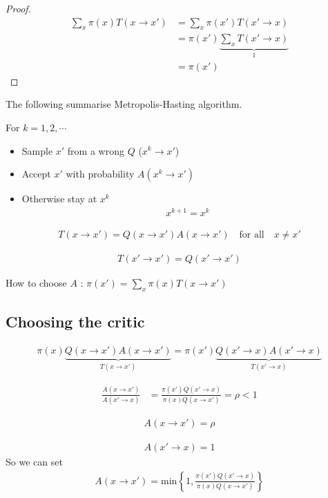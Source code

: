 \documentclass[11pt, oneside, reqno]{amsart}
\numberwithin{equation}{section}
\theoremstyle{plain}%
\theoremstyle{definition}
\theoremstyle{remark}
\begin{document}
\begin{proof}
\begin{align*}
	\sum_x \pi(x) T(x\to x')&=\sum_x \pi(x')T(x'\to x)\\
	&=\pi(x')\underbrace{\sum_x T(x'\to x)}_1\\
	&=\pi(x')
\end{align*}
\end{proof}
The following summarise Metropolis-Hasting algorithm.
\begin{mdframed}
	For $k=1,2,\cdots$
	\begin{itemize}
		\item Sample $x'$ from a {\color{red} wrong} $Q$ ($x^k\to x'$)
		\item Accept $x'$ with probability $A(x^k\to x')$
		\item Otherwise stay at $x^k$
		\begin{align*}
			x^{k+1}=x^k
		\end{align*}
	\end{itemize}
\end{mdframed}

\begin{align*}
	T(x\to x')=Q(x\to x')A(x\to x')\quad\text{for all}\quad x\neq x'
\end{align*}

\begin{align*}
	T(x'\to x')=Q(x'\to x')
\end{align*}

How to choose $A$ : $\pi(x')=\sum_x\pi(x)T(x\to x')$
    
\subsection{Choosing the critic}

\begin{align*}
\pi(x)\underbrace{Q(x\to x')A(x\to x')}_{T(x\to x')}=\pi(x')\underbrace{Q(x'\to x)A(x'\to x)}_{T(x'\to x)}
\end{align*}   

\begin{align*}
	\frac{A(x\to x')}{A(x'\to x)}&=\frac{\pi(x')Q(x'\to x)}{\pi(x)Q(x\to x')}=\rho<1
\end{align*}

\begin{align*}
	A(x\to x')=\rho
\end{align*}

\begin{align*}
	A(x'\to x)=1
\end{align*}
So we can set 
\begin{align*}
	A(x\to x')=\text{min}\left\{1,\frac{\pi(x')Q(x'\to x)}{\pi(x)Q(x\to x')}\right\}
\end{align*}
\end{document}
